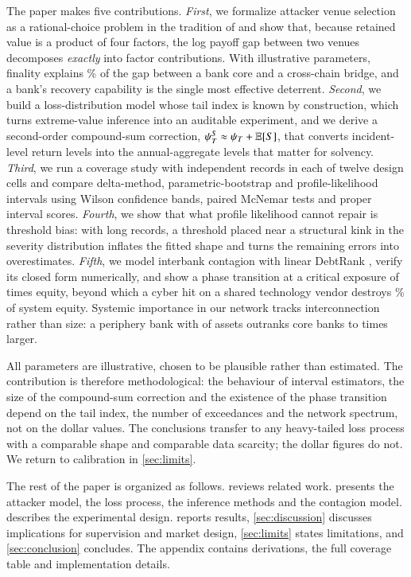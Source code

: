 The paper makes five contributions. \emph{First}, we formalize attacker venue selection as a rational-choice problem in the tradition of \citet{becker1968} and show that, because retained value is a product of four factors, the log payoff gap between two venues decomposes \emph{exactly} into factor contributions. With illustrative parameters, finality explains \shareFinality\% of the gap between a bank core and a cross-chain bridge, and a bank's recovery capability is the single most effective deterrent. \emph{Second}, we build a loss-distribution model whose tail index is known by construction, which turns extreme-value inference into an auditable experiment, and we derive a second-order compound-sum correction, $\psi^{S}_{T} \approx \psi_{T} + \mathbb{E}[S]$, that converts incident-level return levels into the annual-aggregate levels that matter for solvency. \emph{Third}, we run a coverage study with \Reps{} independent records in each of twelve design cells and compare delta-method, parametric-bootstrap and profile-likelihood intervals using Wilson confidence bands, paired McNemar tests and proper interval scores. \emph{Fourth}, we show that what profile likelihood cannot repair is threshold bias: with long records, a threshold placed near a structural kink in the severity distribution inflates the fitted shape and turns the remaining errors into overestimates. \emph{Fifth}, we model interbank contagion with linear DebtRank \citep{bardoscia2015}, verify its closed form numerically, and show a phase transition at a critical exposure of \critExp{} times equity, beyond which a cyber hit on a shared technology vendor destroys \scVendHighShare\% of system equity. Systemic importance in our network tracks interconnection rather than size: a periphery bank with \pOneAssets{} of assets outranks core banks \pOneRatioLo{} to \pOneRatioHi{} times larger.

All parameters are illustrative, chosen to be plausible rather than estimated. The contribution is therefore methodological: the behaviour of interval estimators, the size of the compound-sum correction and the existence of the phase transition depend on the tail index, the number of exceedances and the network spectrum, not on the dollar values. The conclusions transfer to any heavy-tailed loss process with a comparable shape and comparable data scarcity; the dollar figures do not. We return to calibration in \cref{sec:limits}.

The rest of the paper is organized as follows.  reviews related work.  presents the attacker model, the loss process, the inference methods and the contagion model.  describes the experimental design.  reports results, \cref{sec:discussion} discusses implications for supervision and market design, \cref{sec:limits} states limitations, and \cref{sec:conclusion} concludes. The appendix contains derivations, the full coverage table and implementation details.
